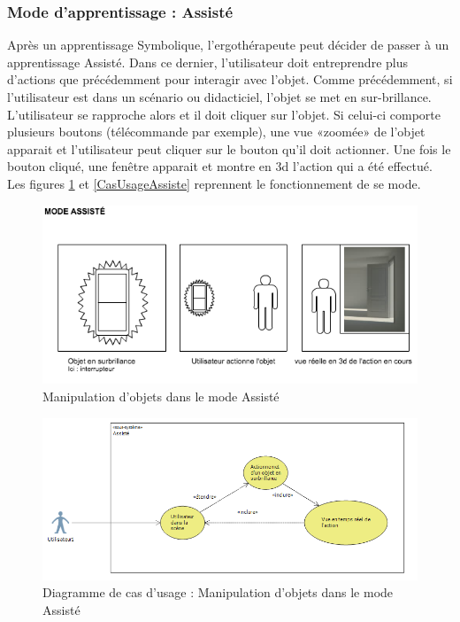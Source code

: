 \subsubsection{Mode d'apprentissage : Assisté}

Après un apprentissage Symbolique, l'ergothérapeute peut décider de passer à un apprentissage Assisté. Dans ce dernier, l'utilisateur doit entreprendre plus d'actions que précédemment pour interagir avec l'objet. Comme précédemment, si l'utilisateur est dans un scénario ou didacticiel, l'objet se met en sur-brillance. L'utilisateur se rapproche alors et il doit cliquer sur l'objet. Si celui-ci comporte plusieurs boutons (télécommande par exemple), une vue «zoomée» de l'objet apparait et l'utilisateur peut cliquer sur le bouton qu'il doit actionner. Une fois le bouton cliqué, une fenêtre apparait et montre en 3d l'action qui a été effectué. 
\\
Les figures \ref{fig:MaquetteAssiste} et \ref{CasUsageAssiste} reprennent le fonctionnement de se mode.

\begin{figure}[h]
\centering
\includegraphics[width=1\textwidth]{2-Specifications/img-utilisateur/assiste.png}
\caption{\label{fig:MaquetteAssiste} Manipulation d'objets dans le mode Assisté }
\end{figure}
\begin{figure}[h]
\centering
\includegraphics[width=1\textwidth]{2-Specifications/img-utilisateur/cas-usage-assiste.png}
\caption{\label{fig:CasUsageAssiste} Diagramme de cas d'usage : Manipulation d'objets dans le mode Assisté }
\end{figure}
\FloatBarrier 


